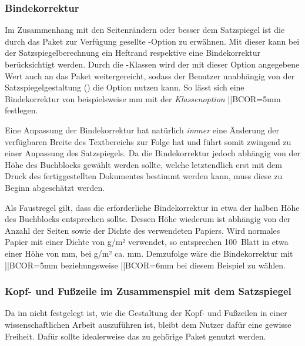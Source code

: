 \begin{DeclareEntity*}{}
\begin{DeclareEntity*}{}
\begin{DeclareEntity*}{}
\subsubsection{%
  Bindekorrektur%
}
%
Im Zusammenhang mit den Seitenrändern oder besser dem Satzspiegel ist die durch 
das Paket  zur Verfügung gesellte \KOMAScript-Option 
 zu erwähnen. Mit dieser kann bei 
der Satzspiegelberechnung ein Heftrand respektive eine Bindekorrektur 
berücksichtigt werden. Durch die \TUDScript-Klassen wird der mit dieser Option 
angegebene Wert auch an das Paket  weitergereicht, sodass der 
Benutzer unabhängig von der Satzspiegelgestaltung () die 
Option  nutzen kann. So lässt sich eine Bindekorrektur von 
beispielsweise \unit[5]{mm} mit der \emph{Klassenoption} \Option||{BCOR=5mm} 
festlegen.

Eine Anpassung der Bindekorrektur hat natürlich \emph{immer} eine Änderung der 
verfügbaren Breite des Textbereichs zur Folge hat und führt somit zwingend zu 
einer Anpassung des Satzspiegels. Da die Bindekorrektur jedoch abhängig von der 
Höhe des Buchblocks gewählt werden sollte, welche letztendlich erst mit dem 
Druck des fertiggestellten Dokumentes bestimmt werden kann, muss diese zu 
Beginn abgeschätzt werden.
%
\begin{Example}
Als Faustregel gilt, dass die erforderliche Bindekorrektur in etwa der halben 
Höhe des Buchblocks entsprechen sollte. Dessen Höhe wiederum ist abhängig von 
der Anzahl der Seiten sowie der Dichte des verwendeten Papiers. Wird normales 
Papier mit einer Dichte von \unit[80]{g/m²} verwendet, so entsprechen 100~Blatt 
in etwa einer Höhe von \unit[10]{mm}, bei \unit[100]{g/m²} ca. \unit[12]{mm}. 
Demzufolge wäre die Bindekorrektur mit \Option||{BCOR=5mm} beziehungsweise 
\Option||{BCOR=6mm} bei diesem Beispiel zu wählen.%
%
\end{Example}



\subsubsection{%
  Kopf- und Fußzeile im Zusammenspiel mit dem Satzspiegel%
}
%
Da im \CD nicht festgelegt ist, wie die Gestaltung der Kopf- und Fußzeilen in 
einer wissenschaftlichen Arbeit auszuführen ist, bleibt dem Nutzer dafür eine 
gewisse Freiheit. Dafür sollte idealerweise das zu \KOMAScript gehörige Paket 
 genutzt werden. 


\end{DeclareEntity*}
\end{DeclareEntity*}
\end{DeclareEntity*}
